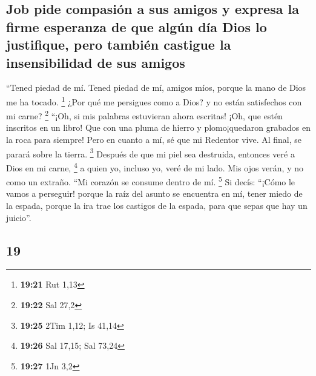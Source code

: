 \begin{paracol}{2}
\hypertarget{job-pide-compasiuxf3n-a-sus-amigos-y-expresa-la-firme-esperanza-de-que-alguxfan-duxeda-dios-lo-justifique-pero-tambiuxe9n-castigue-la-insensibilidad-de-sus-amigos}{%
\subsection{Job pide compasión a sus amigos y expresa la firme esperanza
de que algún día Dios lo justifique, pero también castigue la
insensibilidad de sus
amigos}\label{job-pide-compasiuxf3n-a-sus-amigos-y-expresa-la-firme-esperanza-de-que-alguxfan-duxeda-dios-lo-justifique-pero-tambiuxe9n-castigue-la-insensibilidad-de-sus-amigos}}

 ``Tened piedad de mí. Tened piedad de mí, amigos míos,
porque la mano de Dios me ha tocado. \footnote{\textbf{19:21} Rut 1,13}
 ¿Por qué me persigues como a Dios? y no están
satisfechos con mi carne? \footnote{\textbf{19:22} Sal 27,2}
 ``¡Oh, si mis palabras estuvieran ahora escritas! ¡Oh,
que estén inscritos en un libro!  Que con una pluma de
hierro y plomo¡quedaron grabados en la roca para siempre!
 Pero en cuanto a mí, sé que mi Redentor vive. Al final,
se parará sobre la tierra. \footnote{\textbf{19:25} 2Tim 1,12; Is 41,14}
 Después de que mi piel sea destruida, entonces veré a
Dios en mi carne, \footnote{\textbf{19:26} Sal 17,15; Sal 73,24}
 a quien yo, incluso yo, veré de mi lado. Mis ojos verán,
y no como un extraño. ``Mi corazón se consume dentro de mí. \footnote{\textbf{19:27}
  1Jn 3,2}  Si decís: ``¡Cómo le vamos a perseguir!
porque la raíz del asunto se encuentra en mí,  tener
miedo de la espada, porque la ira trae los castigos de la espada, para
que sepas que hay un juicio''.

\switchcolumn
\begin{otherlanguage}{english}

\hypertarget{section-37}{%
\section{19}\label{section-37}}


\end{otherlanguage}
\end{paracol}
